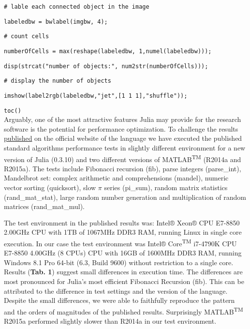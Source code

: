 \verb|# lable each connected object in the image|

\verb|labeledbw = bwlabel(imgbw, 4);|

\verb|# count cells|

\verb|numberOfCells = max(reshape(labeledbw, 1,numel(labeledbw)));|

\verb|disp(strcat("number of objects:", num2str(numberOfCells)));|

\verb|# display the number of objects|

\verb|imshow(label2rgb(labeledbw,"jet",[1 1 1],"shuffle"));|

\verb|toc()|\\



Arguably, one of the most attractive features Julia may provide for the research software is the potential for performance optimization. To challenge the results \href{http://julialang.org/benchmarks/}{published} on the official website of the language we have executed the published standard algorithms performance tests in slightly different environment for a new version of Julia (0.3.10) and two different versions of MATLAB\textsuperscript{TM} (R2014a and R2015a). The tests include Fibonacci recursion (fib), parse integers (parse\_int), Mandelbrot set: complex arithmetic and comprehensions (mandel), numeric vector sorting (quicksort), slow $\pi$ series (pi\_sum), random matrix statistics (rand\_mat\_stat), large random number generation and multiplication of random matrices (rand\_mat\_mul).

The test environment in the published results was: Intel® Xeon® CPU E7-8850 2.00GHz CPU with 1TB of 1067MHz DDR3 RAM, running Linux in single core execution. In our case the test environment was Intel® Core\textsuperscript{TM} i7-4790K CPU E7-8850 4.00GHz (8 CPUs) CPU with 16GB of 1600MHz DDR3 RAM, running Windows 8.1 Pro 64-bit (6.3, Build 9600) without restriction to a single core. Results (\textbf{Tab. 1}) suggest small differences in execution time. The differences are most pronounced for Julia's most efficient Fibonacci Recursion (fib). This can be attributed to the difference in test settings and the version of the language. Despite the small differences, we were able to faithfully reproduce the pattern and the orders of magnitudes of the published results. Surprisingly MATLAB\textsuperscript{TM} R2015a performed slightly slower than R2014a in our test environment.

